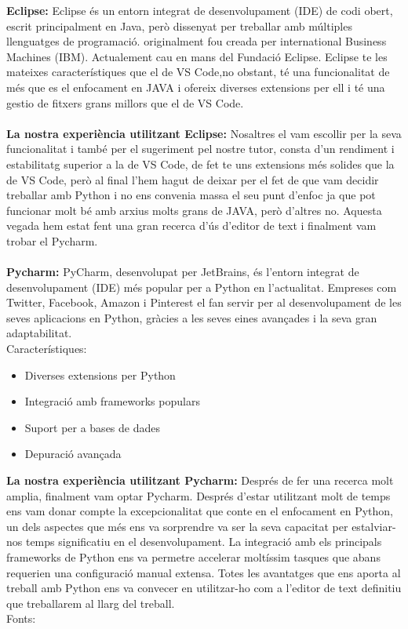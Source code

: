 \textbf{Eclipse:}
Eclipse és un entorn integrat de desenvolupament (IDE) de codi obert, escrit principalment en Java, però dissenyat per treballar amb múltiples llenguatges de programació. originalment fou creada per international Business Machines (IBM). Actualement cau en mans del Fundació Eclipse. Eclipse te les mateixes característiques que el de VS Code,no obstant, té una funcionalitat de més que es el enfocament en JAVA i ofereix diverses extensions per ell i té una gestio de fitxers grans millors que el de VS  Code. \\ \\
\textbf{La nostra experiència utilitzant Eclipse:}
Nosaltres el vam escollir per la seva funcionalitat i també per el sugeriment pel nostre tutor, consta d'un rendiment i estabilitatg superior a la de VS Code, de fet te uns extensions més solides que la de VS Code, però al final l'hem hagut de deixar per el fet de que vam decidir treballar amb Python i no ens convenia massa el seu punt d'enfoc ja que pot funcionar molt bé amb arxius molts grans de JAVA, però d'altres no. Aquesta vegada hem estat fent una gran recerca d'ús d'editor de text i finalment vam trobar el Pycharm. \\ \\
\textbf{Pycharm:}
PyCharm, desenvolupat per JetBrains, és l'entorn integrat de desenvolupament (IDE) més popular per a Python en l'actualitat. Empreses com Twitter, Facebook, Amazon i Pinterest el fan servir per al desenvolupament de les seves aplicacions en Python, gràcies a les seves eines avançades i la seva gran adaptabilitat.\\
Característiques:
\begin{itemize}
 \item Diverses extensions per Python
 \item Integració amb frameworks populars
 \item Suport per a bases de dades
 \item Depuració avançada
\end{itemize}
\textbf{La nostra experiència utilitzant Pycharm:}
Després de fer una recerca molt amplia, finalment vam optar Pycharm. Després d'estar utilitzant molt de temps ens vam donar compte la excepcionalitat que conte en el enfocament en Python, un dels aspectes que més ens va sorprendre va ser la seva capacitat per estalviar-nos temps significatiu en el desenvolupament. La integració amb els principals frameworks de Python ens va permetre accelerar moltíssim tasques que abans requerien una configuració manual extensa.  Totes les avantatges que ens aporta al treball amb Python  ens va convecer en utilitzar-ho com a l'editor de text definitiu que treballarem al llarg del treball.\\
Fonts: \cite{VSCodeilessevesavantatges} \cite{FundacióEclipse} \cite{Totl'hoquehasdesaberdelPycharm} \cite{ToteslesnovetatsdePycharm}

